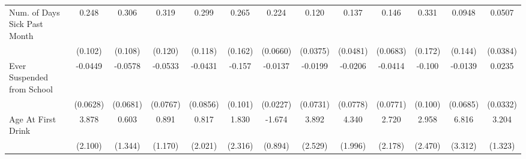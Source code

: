 {\begin{tabular}{l*{12}{c}}
\addlinespace
Num. of Days Sick Past Month&       0.248\sym{*}  &       0.306\sym{**} &       0.319\sym{**} &       0.299\sym{*}  &       0.265         &       0.224\sym{***}&       0.120\sym{**} &       0.137\sym{**} &       0.146\sym{*}  &       0.331         &      0.0948         &      0.0507         \\
            &     (0.102)         &     (0.108)         &     (0.120)         &     (0.118)         &     (0.162)         &    (0.0660)         &    (0.0375)         &    (0.0481)         &    (0.0683)         &     (0.172)         &     (0.144)         &    (0.0384)         \\
\addlinespace
Ever Suspended from School&     -0.0449         &     -0.0578         &     -0.0533         &     -0.0431         &      -0.157         &     -0.0137         &     -0.0199         &     -0.0206         &     -0.0414         &      -0.100         &     -0.0139         &      0.0235         \\
            &    (0.0628)         &    (0.0681)         &    (0.0767)         &    (0.0856)         &     (0.101)         &    (0.0227)         &    (0.0731)         &    (0.0778)         &    (0.0771)         &     (0.100)         &    (0.0685)         &    (0.0332)         \\
\addlinespace
Age At First Drink&       3.878         &       0.603         &       0.891         &       0.817         &       1.830         &      -1.674         &       3.892         &       4.340\sym{*}  &       2.720         &       2.958         &       6.816\sym{*}  &       3.204\sym{*}  \\
            &     (2.100)         &     (1.344)         &     (1.170)         &     (2.021)         &     (2.316)         &     (0.894)         &     (2.529)         &     (1.996)         &     (2.178)         &     (2.470)         &     (3.312)         &     (1.323)         \\
\bottomrule
\end{tabular}
}
